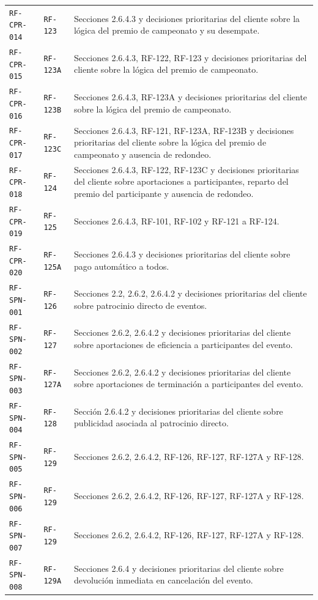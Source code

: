 \documentclass[10pt,letterpaper]{article}
\begin{document}
\begin{landscape}
\begin{longtable}{P{2.7cm}P{2.6cm}P{15.7cm}}
\texttt{RF-CPR-014} & \texttt{RF-123} & Secciones 2.6.4.3 y decisiones prioritarias del cliente sobre la lógica del premio de campeonato y su desempate.\\
\texttt{RF-CPR-015} & \texttt{RF-123A} & Secciones 2.6.4.3, RF-122, RF-123 y decisiones prioritarias del cliente sobre la lógica del premio de campeonato.\\
\texttt{RF-CPR-016} & \texttt{RF-123B} & Secciones 2.6.4.3, RF-123A y decisiones prioritarias del cliente sobre la lógica del premio de campeonato.\\
\texttt{RF-CPR-017} & \texttt{RF-123C} & Secciones 2.6.4.3, RF-121, RF-123A, RF-123B y decisiones prioritarias del cliente sobre la lógica del premio de campeonato y ausencia de redondeo.\\
\texttt{RF-CPR-018} & \texttt{RF-124} & Secciones 2.6.4.3, RF-122, RF-123C y decisiones prioritarias del cliente sobre aportaciones a participantes, reparto del premio del participante y ausencia de redondeo.\\
\texttt{RF-CPR-019} & \texttt{RF-125} & Secciones 2.6.4.3, RF-101, RF-102 y RF-121 a RF-124.\\
\texttt{RF-CPR-020} & \texttt{RF-125A} & Secciones 2.6.4.3 y decisiones prioritarias del cliente sobre pago automático a todos.\\
\texttt{RF-SPN-001} & \texttt{RF-126} & Secciones 2.2, 2.6.2, 2.6.4.2 y decisiones prioritarias del cliente sobre patrocinio directo de eventos.\\
\texttt{RF-SPN-002} & \texttt{RF-127} & Secciones 2.6.2, 2.6.4.2 y decisiones prioritarias del cliente sobre aportaciones de eficiencia a participantes del evento.\\
\texttt{RF-SPN-003} & \texttt{RF-127A} & Secciones 2.6.2, 2.6.4.2 y decisiones prioritarias del cliente sobre aportaciones de terminación a participantes del evento.\\
\texttt{RF-SPN-004} & \texttt{RF-128} & Sección 2.6.4.2 y decisiones prioritarias del cliente sobre publicidad asociada al patrocinio directo.\\
\texttt{RF-SPN-005} & \texttt{RF-129} & Secciones 2.6.2, 2.6.4.2, RF-126, RF-127, RF-127A y RF-128.\\
\texttt{RF-SPN-006} & \texttt{RF-129} & Secciones 2.6.2, 2.6.4.2, RF-126, RF-127, RF-127A y RF-128.\\
\texttt{RF-SPN-007} & \texttt{RF-129} & Secciones 2.6.2, 2.6.4.2, RF-126, RF-127, RF-127A y RF-128.\\
\texttt{RF-SPN-008} & \texttt{RF-129A} & Secciones 2.6.4 y decisiones prioritarias del cliente sobre devolución inmediata en cancelación del evento.\\

\end{longtable}
\end{landscape}
\end{document}

